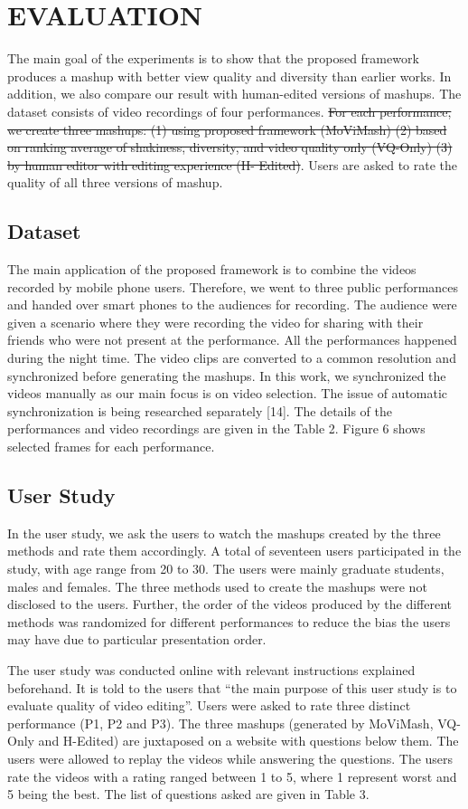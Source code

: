 \documentclass{sig-alternate-05-2015}
\providecommand{\DIFadd}[1]{{\protect\color{blue}\uwave{#1}}} %
\providecommand{\DIFdel}[1]{{\protect\color{red}\sout{#1}}}                      %
\providecommand{\DIFaddbegin}{} %
\providecommand{\DIFaddend}{} %
\providecommand{\DIFdelbegin}{} %
\providecommand{\DIFdelend}{} %
\begin{document}
\section{EVALUATION}
The main goal of the experiments is to show that the proposed
framework produces a mashup with better view quality and diversity than earlier works. In addition, we also compare our result with
human-edited versions of mashups. The dataset consists of video
recordings of four performances. \DIFdelbegin \DIFdel{For each performance, we create three mashups: (1) using proposed framework (MoViMash) (2)
based on ranking average of shakiness, diversity, and video quality only (VQ-Only) (3) by human editor with editing experience (H-
Edited)}\DIFdelend \DIFaddbegin \DIFadd{Hey how are you}\DIFaddend . Users are asked to rate the quality of all three versions of
mashup.\DIFaddbegin \DIFadd{Shailmasknd.
}\DIFaddend \subsection{Dataset}
The main application of the proposed framework is to combine
the videos recorded by mobile phone users. Therefore, we went to
three public performances and handed over smart phones to the audiences for recording. The audience were given a scenario where
they were recording the video for sharing with their friends who
were not present at the performance. All the performances happened during the night time. The video clips are converted to a
common resolution and synchronized before generating the mashups.
In this work, we synchronized the videos manually as our main focus is on video selection. The issue of automatic synchronization is
being researched separately [14]. The details of the performances
and video recordings are given in the Table 2. Figure 6 shows selected frames for each performance.
\subsection{User Study}
In the user study, we ask the users to watch the mashups created
by the three methods and rate them accordingly. A total of seventeen users participated in the study, with age range from 20 to 30.
The users were mainly graduate students, males and females. The
three methods used to create the mashups were not disclosed to the
users. Further, the order of the videos produced by the different
methods was randomized for different performances to reduce the
bias the users may have due to particular presentation order.\par
The user study was conducted online with relevant instructions
explained beforehand. It is told to the users that “the main purpose
of this user study is to evaluate quality of video editing”. Users
were asked to rate three distinct performance (P1, P2 and P3). The
three mashups (generated by MoViMash, VQ-Only and H-Edited)
are juxtaposed on a website with questions below them. The users were allowed to replay the videos while answering the questions.
The users rate the videos with a rating ranged between 1 to 5, where
1 represent worst and 5 being the best. The list of questions asked
are given in Table 3.
\end{document}

